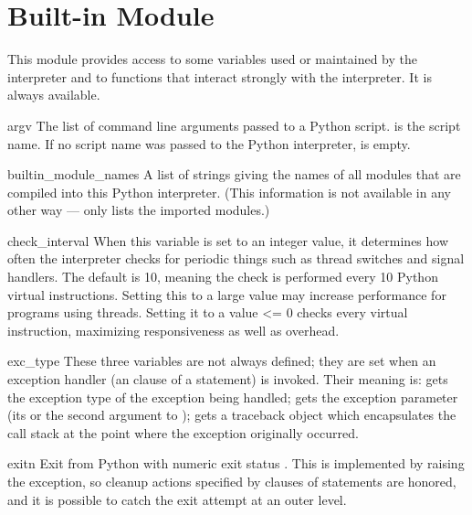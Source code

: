 \section{Built-in Module }

This module provides access to some variables used or maintained by the
interpreter and to functions that interact strongly with the interpreter.
It is always available.

\renewcommand{\indexsubitem}{(in module sys)}
\begin{datadesc}{argv}
  The list of command line arguments passed to a Python script.
   is the script name.
  If no script name was passed to the Python interpreter,
   is empty.
\end{datadesc}

\begin{datadesc}{builtin_module_names}
  A list of strings giving the names of all modules that are compiled
  into this Python interpreter.  (This information is not available in
  any other way ---  only lists the imported
  modules.)
\end{datadesc}

\begin{datadesc}{check_interval}
When this variable is set to an integer value, it determines how often
the interpreter checks for periodic things such as thread switches and
signal handlers.  The default is 10, meaning the check is performed
every 10 Python virtual instructions.  Setting this to a large value
may increase performance for programs using threads.  Setting it to a
value <= 0 checks every virtual instruction, maximizing responsiveness
as well as overhead.
\end{datadesc}

\begin{datadesc}{exc_type}
  These three variables are not always defined; they are set when an
  exception handler (an  clause of a  statement) is
  invoked.  Their meaning is:  gets the exception type of
  the exception being handled;  gets the exception
  parameter (its  or the second argument to
  );  gets a traceback object which
  encapsulates the call stack at the point where the exception
  originally occurred.
\end{datadesc}

\begin{funcdesc}{exit}{n}
  Exit from Python with numeric exit status .  This is
  implemented by raising the  exception, so cleanup
  actions specified by  clauses of  statements
  are honored, and it is possible to catch the exit attempt at an outer
  level.
\end{funcdesc}

